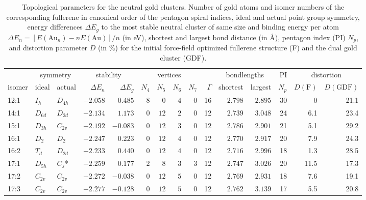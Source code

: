 \begin{table}[ht!]
	\centering
	\small
	\caption{Topological parameters for the neutral gold clusters. Number of gold atoms and isomer numbers of the corresponding fullerene in canonical order of the pentagon spiral indices,\autocite{Fowler-atlas-2006} ideal and actual point group symmetry, energy differences $\Delta E_g$ to the most stable neutral cluster of same size and binding energy per atom $\Delta E_n = [E(\textrm{Au}_n)-nE(\textrm{Au})]/n$  (in eV), shortest and largest bond distance (in \AA), pentagon index (PI) $N_p$, and distortion parameter $D$ (in \%) for the initial force-field optimized fullerene structure (F) and the dual gold cluster (GDF).}
	\begin{tabular}{lllrrrrrrrrrrrr}
\toprule
\multicolumn{1}{c}{  } & \multicolumn{2}{c}{ symmetry  }  & \multicolumn{2}{c}{stability} & \multicolumn{4}{c}{ vertices } & & \multicolumn{2}{c}{ bondlengths } &  PI & \multicolumn{2}{c}{ distortion } \\
isomer & ideal  & actual  & $\Delta E_n$ &$\Delta E_g$ & \multicolumn{1}{c}{$N_4$} & \multicolumn{1}{c}{$N_5$} & \multicolumn{1}{c}{$N_6$} & \multicolumn{1}{c}{$N_7$} & $\Gamma$ & shortest & largest  & $N_p$ & $D(\textrm{F})$ & $D(\textrm{GDF})$\\\midrule
12:1    & $I_h$    & $D_{4h}$ & $-2.058$ & $0.485$  & $8$ & $0$  & $4$      & $0$ & 16 & $2.798$ & $2.895$ & 30  & 0    &  21.1    \\
14:1    & $D_{6d}$ & $D_{2d}$ & $-2.134$ & $1.173$  & $0$ & $12$ & $2$      & $0$ & 12 & $2.739$ & $3.048$ & 24  & 6.1  &  23.4    \\
15:1    & $D_{3h}$ & $C_{2v}$ & $-2.192$ & $-0.083$ & $0$ & $12$ & $3$      & $0$ & 12 & $2.786$ & $2.901$ & 21  & 5.1  &  29.2    \\
16:1    & $D_2$    & $D_{2 }$ & $-2.247$ & $0.223$  & $0$ & $12$ & $4$      & $0$ & 12 & $2.770$ & $2.917$ & 20  & 7.9  &  24.3    \\
16:2    & $T_d$    & $D_{2d}$ & $-2.233$ & $0.440$  & $0$ & $12$ & $4$      & $0$ & 12 & $2.716$ & $2.996$ & 18  & 1.3  &  28.5    \\
17:1    & $D_{5h}$ & $C_s$*   & $-2.259$ & $0.177$  & $2$ & $8$  & $3$      & $3$ & 12 & $2.747$ & $3.026$ & 20  & 11.5 &  17.3    \\
17:2    & $C_{2v}$ & $C_{2v}$ & $-2.272$ & $-0.038$ & $0$ & $12$ & $5$      & $0$ & 12 & $2.769$ & $2.931$ & 18  & 7.6  &  19.1    \\
17:3    & $C_{2v}$ & $C_{2v}$ & $-2.277$ & $-0.128$ & $0$ & $12$ & $5$      & $0$ & 12 & $2.762$ & $3.139$ & 17  & 5.5  &  20.8    \\

\end{tabular}
\end{table}

